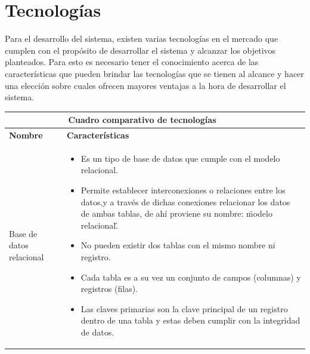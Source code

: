 \section{Tecnologías}
Para el desarrollo del sistema, existen varias tecnologías en el mercado que cumplen con el propósito de desarrollar el sistema y alcanzar los objetivos planteados. Para esto es necesario tener el conocimiento acerca de las características que pueden brindar las tecnologías que se tienen al alcance y hacer una elección sobre cuales ofrecen mayores ventajas a la hora de desarrollar el sistema.
\vspace{10mm}
	\begin{table}[b!]
    \centering
    \vspace{-30mm}
      \begin{tabular}{|p{2cm}|ll}
        \hline
        
        \multicolumn{2}{|c|}{{\bf Cuadro comparativo de tecnologías}} \\ 
        \hline
          \multicolumn{1}{|p{4cm}|}{{\bf Nombre}} & 
		  \multicolumn{1}{p{10cm}|}{{\bf Características}}\\

        \hline
          \multicolumn{1}{|p{5cm}|}{Base de datos relacional} & 
          \multicolumn{2}{p{10cm}|}{\begin{itemize}
          \vspace{-5mm}
        \item Es un tipo de base de datos que cumple con el modelo relacional.
        \item Permite establecer interconexiones o relaciones entre los datos,y a través de dichas conexiones relacionar los datos de ambas tablas, de ahí proviene su nombre: \"modelo relacional\".
        \item No pueden existir dos tablas con el mismo nombre ni registro.
        \item Cada tabla es a su vez un conjunto de campos (columnas) y registros (filas).
        \item Las claves primarias son la clave principal de un registro dentro de una tabla y estas deben cumplir con la integridad de datos.\cite{28}
       
      \end{itemize}} \\
         

\end{tabular}
\end{table}
